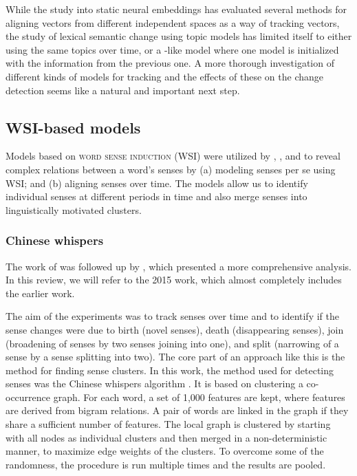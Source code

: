 \documentclass[output=paper]{langsci/langscibook}
\begin{document}
While the study into static neural embeddings has evaluated several methods for aligning vectors from different independent spaces as a way of tracking vectors, the study of lexical semantic change using topic models has limited itself to either using the same topics over time, or a \citet{kim-etal-2014-temporal}-like model where one model is initialized with the information from the previous one. A more thorough investigation of different kinds of models for tracking and the effects of these on the change detection seems like a natural and important next step. 
 
    
\subsection{WSI-based models}\label{subs:WSI-models}
Models based on \textsc{word sense induction} (WSI) were utilized by \citet{mitra-etal-2014-thats,mitra2015automatic}, \citet{tahmasebi2013models}, and \citet{tahmasebi-ranlp17} to reveal complex relations between a word's senses by (a) modeling senses per se using WSI; and (b) aligning senses over time. The models allow us to identify individual senses at different periods in time and \citet{tahmasebi-ranlp17} also merge senses into linguistically motivated clusters.

\subsubsection{Chinese whispers}
The work of \citet{mitra-etal-2014-thats} was followed up by \citet{mitra2015automatic}, which presented a more comprehensive analysis. In this review, we will refer to the 2015 work, which almost completely includes the earlier work. 

The aim of the experiments was to track senses over time and to identify if the sense changes were due to birth (novel senses), death (disappearing senses), join (broadening of senses by two senses joining into one), and split (narrowing of a sense by a sense splitting into two). The core part of an approach like this is the method for finding sense clusters. In this work, the method used for detecting senses was the Chinese whispers algorithm \citep{biemann_2006}. It is based on clustering a co-occurrence graph. For each word, a set of 1,000 features are kept, where features are derived from bigram relations. A pair of words are linked in the graph if they share a sufficient number of features. The local graph is clustered by starting with all nodes as individual clusters and then merged in a non-deterministic manner, to maximize edge weights of the clusters. To overcome some of the randomness, the procedure is run multiple times and the results are pooled. 
\end{document}
